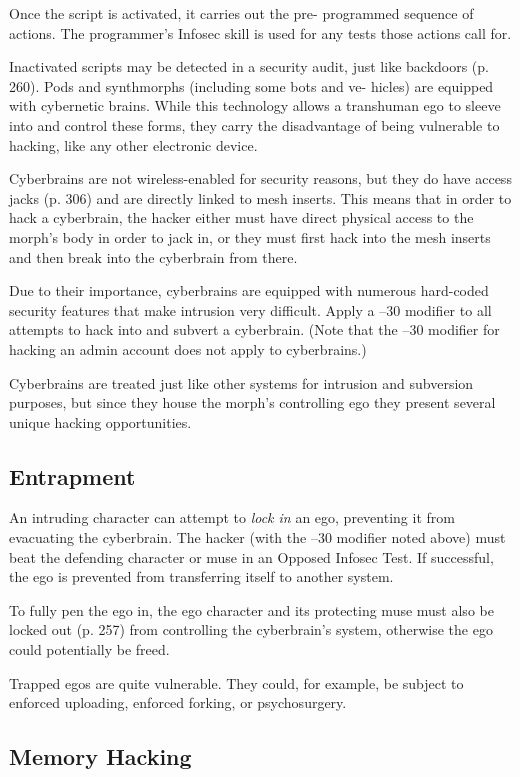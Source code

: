 Once the script is activated, it carries out the pre-
programmed sequence of actions. The programmer's 
Infosec skill is used for any tests those actions call for.

Inactivated scripts may be detected in a security 
audit, just like backdoors (p. 260).
Pods and synthmorphs (including some bots and ve-
hicles) are equipped with cybernetic brains. While this 
technology allows a transhuman ego to sleeve into and 
control these forms, they carry the disadvantage of being 
vulnerable to hacking, like any other electronic device.

Cyberbrains are not wireless-enabled for security 
reasons, but they do have access jacks (p. 306) and 
are directly linked to mesh inserts. This means that 
in order to hack a cyberbrain, the hacker either must 
have direct physical access to the morph's body in 
order to jack in, or they must first hack into the mesh 
inserts and then break into the cyberbrain from there.

Due to their importance, cyberbrains are equipped 
with numerous hard-coded security features that make 
intrusion very difficult. Apply a –30 modifier to all 
attempts to hack into and subvert a cyberbrain. (Note 
that the –30 modifier for hacking an admin account 
does not apply to cyberbrains.)

Cyberbrains are treated just like other systems for 
intrusion and subversion purposes, but since they 
house the morph's controlling ego they present several 
unique hacking opportunities.

\subsection{Entrapment}

An intruding character can attempt to \textit{lock in} an ego, 
preventing it from evacuating the cyberbrain. The 
hacker (with the –30 modifier noted above) must 
beat the defending character or muse in an Opposed 
Infosec Test. If successful, the ego is prevented from 
transferring itself to another system.

To fully pen the ego in, the ego character and its 
protecting muse must also be locked out (p. 257) from 
controlling the cyberbrain's system, otherwise the ego 
could potentially be freed.

 Trapped egos are quite vulnerable. They could, for 
example, be subject to enforced uploading, enforced 
forking, or psychosurgery.

\subsection{Memory Hacking}

